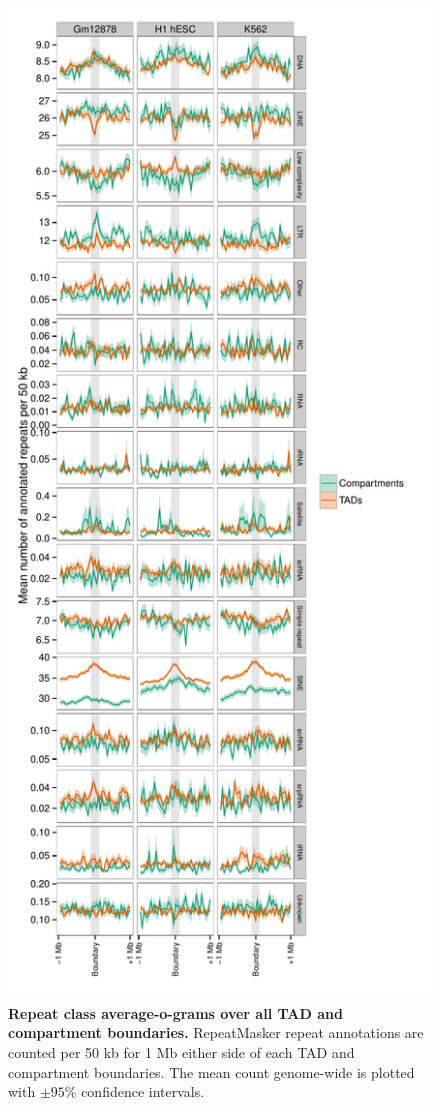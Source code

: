 \documentclass[a4paper,10pt,oneside]{book}
\begin{document}
\begin{figure}
\begin{center} 
\includegraphics[width=.88\textwidth]{figs/rep_classprofiles.pdf}
\captionsetup{width=\textwidth}
\caption{ {\bf Repeat class average-o-grams over all TAD and compartment boundaries.}
RepeatMasker repeat annotations are counted per 50 kb for 1 Mb either side of each TAD and compartment boundaries. The mean count genome-wide is plotted with $\pm 95\%$ confidence intervals.
}\label{fig:rep_classprofiles}
\end{center}
\end{figure} 
\end{document}
